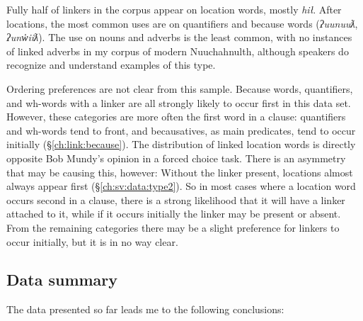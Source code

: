 Fully half of linkers in the corpus appear on location words, mostly \textit{hił}. After locations, the most common uses are on quantifiers and because words (\textit{ʔuunuuƛ}, \textit{ʔunw̓iiƛ}). The use on nouns and adverbs is the least common, with no instances of linked adverbs in my corpus of modern Nuuchahnulth, although speakers do recognize and understand examples of this type.

Ordering preferences are not clear from this sample. Because words, quantifiers, and wh-words with a linker are all strongly likely to occur first in this data set. However, these categories are more often the first word in a clause: quantifiers and wh-words tend to front, and becausatives, as main predicates, tend to occur initially (\S\ref{ch:link:because}). The distribution of linked location words is directly opposite Bob Mundy's opinion in a forced choice task. There is an asymmetry that may be causing this, however: Without the linker present, locations almost always appear first (\S\ref{ch:sv:data:type2}). So in most cases where a location word occurs second in a clause, there is a strong likelihood that it will have a linker attached to it, while if it occurs initially the linker may be present or absent. From the remaining categories there may be a slight preference for linkers to occur initially, but it is in no way clear.

\subsection{Data summary}

The data presented so far leads me to the following conclusions:

